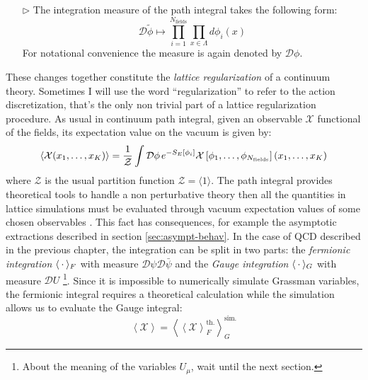 \documentclass[english, LaM, oneside, noexaminfo]{sapthesis}
\newcommand{\la}{\langle}
\newcommand{\ra}{\rangle}
\begin{document}
\begin{itemize}
    \item [$\triangleright$] The integration measure of the path integral takes the following form:
        \begin{equation*}
            \mathcal{D}\tilde{\phi} \longmapsto \prod_{i=1}^{N_\text{fields}} \prod_{x\in \Lambda} d\phi_i (x)
        \end{equation*}
        For notational convenience the measure is again denoted by $\mathcal{D}\phi$.
\end{itemize}
These changes together constitute the \textit{lattice regularization} of a continuum theory. 
Sometimes I will use the word ``regularization'' to refer to the action discretization, that's the only non trivial part of a lattice regularization procedure. 
\newline
As usual in continuum path integral, given an observable $\mathcal{X}$ functional of the fields, its expectation value on the vacuum is given by:
\begin{equation*}
    \la \mathcal{X} (x_1,\dots,x_K) \ra = \frac{1}{\mathcal Z} \int \mathcal{D} \phi \hspace*{0.5mm} e^{-S_E[\phi_i]} \mathcal{X}\left[\phi_1,\dots,\phi_{N_\text{fields}}\right] (x_1,\dots,x_K)
\end{equation*}
where $\mathcal Z$ is the usual partition function $\mathcal Z = \la 1 \ra$.
The path integral provides theoretical tools to handle a non perturbative theory then all the quantities in lattice simulations must be evaluated through vacuum expectation values of some chosen observables \cite{Itzykson-Zuber}.
This fact has consequences, for example the asymptotic extractions described in section \ref{sec:asympt-behav}.
\newline
In the case of QCD described in the previous chapter, the integration can be split in two parts: the {\it fermionic integration} $\la \hspace*{0.7mm} \cdot \hspace*{0.7mm} \ra_F$ with measure $\mathcal{D}\psi\mathcal{D}\bar\psi$ and the {\it Gauge integration} $\la \hspace*{0.7mm} \cdot \hspace*{0.7mm} \ra_G$ with measure $\mathcal{D}U$ \footnote{About the meaning of the variables $U_\mu$, wait until the next section.}.
Since it is impossible to numerically simulate Grassman variables, the fermionic integral requires a theoretical calculation while the simulation allows us to evaluate the Gauge integral:
\begin{equation*}
    \left\la \mathcal{X} \right\ra = \left\la \left\la \mathcal{X} \right\ra_F^\text{th.} \right\ra_G^\text{sim.}
\end{equation*}
\end{document}
